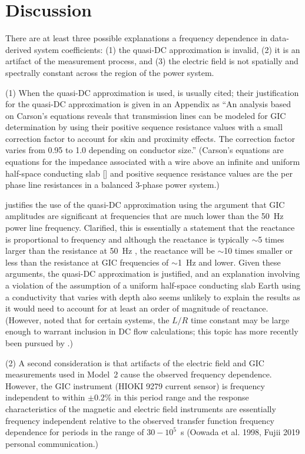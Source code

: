 \documentclass[draft,linenumbers]{agujournal2018}
\begin{document}
\section{Discussion}

There are at least three possible explanations a frequency dependence in data-derived system coefficients: (1) the quasi-DC approximation is invalid, (2) it is an artifact of the measurement process, and (3) the electric field is not spatially and spectrally constant across the region of the power system. 

(1) When the quasi-DC approximation is used, \cite{Albertson1981} is usually cited; their justification for the quasi-DC approximation is given in an Appendix as ``An analysis based on Carson's equations reveals that transmission lines can be modeled for GIC determination by using their positive sequence resistance values with a small correction factor to account for skin and proximity effects. The correction factor varies from 0.95 to 1.0 depending on conductor size.'' (Carson's equations are equations for the impedance associated with a wire above an infinite and uniform half-space conducting slab [\cite{Carson1926,Grigsby2007}] and positive sequence resistance values are the per phase line resistances in a balanced 3-phase power system.)

\cite{Lehtinen1985} justifies the use of the quasi-DC approximation using the argument that GIC amplitudes are significant at frequencies that are much lower than the 50~Hz power line frequency. Clarified, this is essentially a statement that the reactance is proportional to frequency and although the reactance is typically $\sim$5 times larger than the resistance at 50~Hz \citep{Purchala2005}, the reactance will be $\sim$10 times smaller or less than the resistance at GIC frequencies of $\sim$1~Hz and lower. Given these arguments, the quasi-DC approximation is justified, and an explanation involving a violation of the assumption of a uniform half-space conducting slab Earth using a conductivity that varies with depth also seems unlikely to explain the results as it would need to account for at least an order of magnitude of reactance. (However, \cite{Boteler1994} noted that for certain systems, the $L/R$ time constant may be large enough to warrant inclusion in DC flow calculations; this topic has more recently been pursued by \cite{Oyedokun2013a}.)

(2) A second consideration is that artifacts of the electric field and GIC measurements used in Model~2 cause the observed frequency dependence. However, the GIC instrument (HIOKI 9279 current sensor) is frequency independent to within $\pm 0.2$\% in this period range and the response characteristics of the magnetic and electric field instruments are essentially frequency independent relative to the observed transfer function frequency dependence for periods in the range of $30-10^{5}$~s (Oowada et al. 1998, Fujii 2019 personal communication.)
\end{document}
